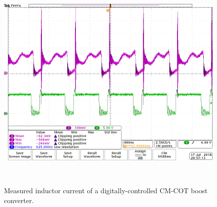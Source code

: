 \begin{figure}
\begin{minipage}{0.32\textwidth}
    \centering
    \includegraphics[width=\textwidth]{Figure/section1/ripplecurrent.png}
    \caption{ \label{fig:noisecurrent} Measured inductor current of a digitally-controlled CM-COT boost converter.}
\end{minipage}
~
\end{figure}

